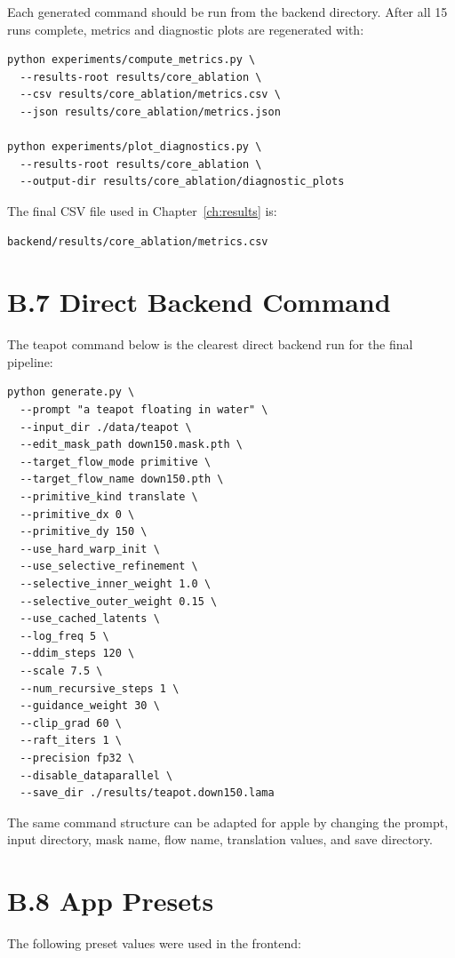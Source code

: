 Each generated command should be run from the backend directory. After all 15 runs complete, metrics and diagnostic plots are regenerated with:

\begin{verbatim}
python experiments/compute_metrics.py \
  --results-root results/core_ablation \
  --csv results/core_ablation/metrics.csv \
  --json results/core_ablation/metrics.json

python experiments/plot_diagnostics.py \
  --results-root results/core_ablation \
  --output-dir results/core_ablation/diagnostic_plots
\end{verbatim}

The final CSV file used in Chapter~\ref{ch:results} is:

\begin{verbatim}
backend/results/core_ablation/metrics.csv
\end{verbatim}

\section*{B.7 Direct Backend Command}

The teapot command below is the clearest direct backend run for the final pipeline:

\begin{verbatim}
python generate.py \
  --prompt "a teapot floating in water" \
  --input_dir ./data/teapot \
  --edit_mask_path down150.mask.pth \
  --target_flow_mode primitive \
  --target_flow_name down150.pth \
  --primitive_kind translate \
  --primitive_dx 0 \
  --primitive_dy 150 \
  --use_hard_warp_init \
  --use_selective_refinement \
  --selective_inner_weight 1.0 \
  --selective_outer_weight 0.15 \
  --use_cached_latents \
  --log_freq 5 \
  --ddim_steps 120 \
  --scale 7.5 \
  --num_recursive_steps 1 \
  --guidance_weight 30 \
  --clip_grad 60 \
  --raft_iters 1 \
  --precision fp32 \
  --disable_dataparallel \
  --save_dir ./results/teapot.down150.lama
\end{verbatim}

The same command structure can be adapted for apple by changing the prompt, input directory, mask name, flow name, translation values, and save directory.

\section*{B.8 App Presets}

The following preset values were used in the frontend:

